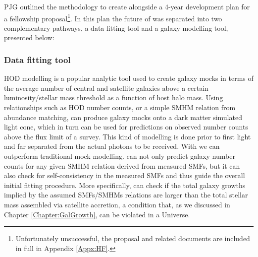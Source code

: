 PJG outlined the methodology to create \steel alongside a 4-year development plan for a fellowship proposal\footnote{Unfortunately unsuccessful, the proposal and related documents are included in full in Appendix \ref{Appx:HF}.}. In this plan the future of \steel was separated into two complementary pathways, a data fitting tool and a galaxy modelling tool, presented below:

\subsubsection{Data fitting tool}

HOD modelling is a popular analytic tool used to create galaxy mocks in terms of the average number of central and satellite galaxies above a certain luminosity/stellar mass threshold as a function of host halo mass. Using relationships such as HOD number counts, or a simple SMHM relation from abundance matching, can produce galaxy mocks onto a dark matter simulated light cone, which in turn can be used for predictions on observed number counts above the flux limit of a survey. This kind of modelling is done prior to first light and far separated from the actual photons to be received. With \steel we can outperform traditional mock modelling. \steel can not only predict galaxy number counts for any given SMHM relation derived from measured SMFs, but it can also check for self-consistency in the measured SMFs and thus guide the overall initial fitting procedure. More specifically, \steel can check if the total galaxy growths implied by the assumed SMFs/SMHMs relations are larger than the total stellar mass assembled via satellite accretion, a condition that, as we discussed in Chapter \ref{Chapter:GalGrowth}, can be violated in a \LCDM Universe.

